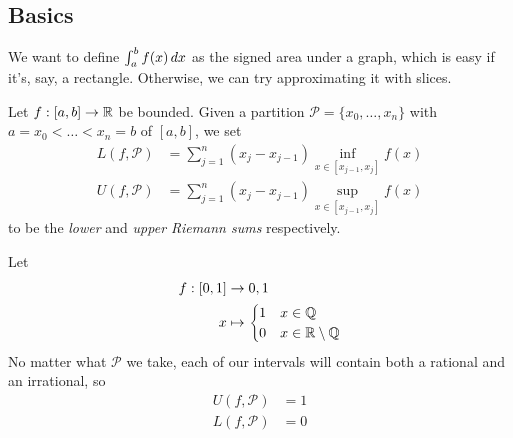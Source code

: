 \documentclass{../../template/note}
\begin{document}
    \subsection{Basics}

    We want to define \(\int_a^b f(x) \,d{x}\) as the signed area under a graph, which is easy if it's, say, a rectangle. Otherwise, we can try approximating it with slices.
    
    \begin{definition}
        Let \(f: [a, b] \to \mathbb R\) be bounded. Given a partition \(\mathcal P = \{x_0, \dots, x_n\}\) with \(a = x_0 < \dots < x_n = b\) of \([a, b]\), we set
        \begin{align*}
            L(f, \mathcal P) &= \sum_{j=1}^n (x_j-x_{j-1})\inf_{x \in [x_{j-1},x_j]}f(x)\\
            U(f, \mathcal P) &= \sum_{j=1}^n (x_j-x_{j-1})\sup_{x \in [x_{j-1},x_j]}f(x)
        \end{align*}
        to be the \emph{lower} and \emph{upper Riemann sums} respectively.
    \end{definition}
    
    \begin{example*}
        Let
        \begin{align*}
            f: [0, 1] &\to {0, 1} \\
            x &\mapsto \begin{cases}
                1 & x \in \mathbb Q \\
                0 & x \in \mathbb R \setminus \mathbb Q
            \end{cases}
        \end{align*}
        No matter what \(\mathcal P\) we take, each of our intervals will contain both a rational and an irrational, so
        \begin{align*}
            U(f, \mathcal P) &= 1 \\
            L(f, \mathcal P) &= 0
        \end{align*}
    \end{example*}
    
\end{document}
